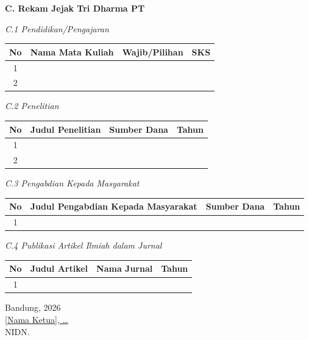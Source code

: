 \textbf{C. Rekam Jejak Tri Dharma PT}

\textit{C.1 Pendidikan/Pengajaran}
\begin{table}[h]
    \begin{tabularx}{\textwidth}{|c|X|X|c|}
        \hline
        \textbf{No} & \textbf{Nama Mata Kuliah} & \textbf{Wajib/Pilihan} & \textbf{SKS} \\ \hline
        1 & & & \\ \hline
        2 & & & \\ \hline
    \end{tabularx}
\end{table}

\textit{C.2 Penelitian}
\begin{table}[h]
    \begin{tabularx}{\textwidth}{|c|X|X|c|}
        \hline
        \textbf{No} & \textbf{Judul Penelitian} & \textbf{Sumber Dana} & \textbf{Tahun} \\ \hline
        1 & & & \\ \hline
        2 & & & \\ \hline
    \end{tabularx}
\end{table}

\textit{C.3 Pengabdian Kepada Masyarakat}
\begin{table}[h]
    \begin{tabularx}{\textwidth}{|c|X|X|c|}
        \hline
        \textbf{No} & \textbf{Judul Pengabdian Kepada Masyarakat} & \textbf{Sumber Dana} & \textbf{Tahun} \\ \hline
        1 & & & \\ \hline
    \end{tabularx}
\end{table}

\textit{C.4 Publikasi Artikel Ilmiah dalam Jurnal}
\begin{table}[h]
    \begin{tabularx}{\textwidth}{|c|X|X|c|}
        \hline
        \textbf{No} & \textbf{Judul Artikel} & \textbf{Nama Jurnal} & \textbf{Tahun} \\ \hline
        1 & & & \\ \hline
    \end{tabularx}
\end{table}

\vspace{1cm}
\begin{flushright}
    Bandung, \hspace{2cm} 2026\\[1cm]
    \underline{{[Nama Ketua]}, \ldots}\\
    NIDN.
\end{flushright}

